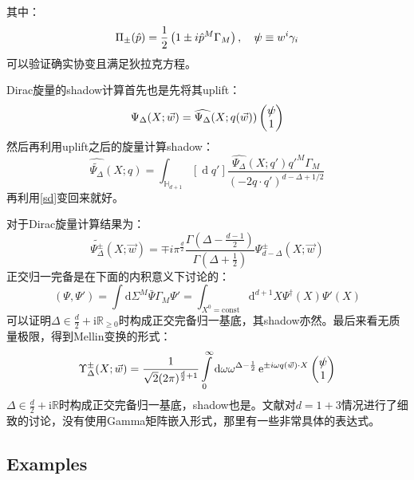 其中：
\begin{equation}
	\Pi_{\pm}(\hat{p})=\frac{1}{2}\left(1\pm i\hat{p}^M\Gamma_M\right),\quad \slashed{w}\equiv w^i\gamma_i
\end{equation}
可以验证确实协变且满足狄拉克方程\sn{\[\left(\Gamma^M\frac{\partial}{\partial X^M}-m\right)\Psi(X)=0\]}。
\begin{definition}
	Dirac旋量的shadow计算首先也是先将其uplift：
	\begin{equation}\label{sd}
		\Psi_\Delta(X;\vec{w})=\widehat{\Psi_\Delta}(X;q(\vec{w}))\begin{pmatrix}\slashed{w}\\1\end{pmatrix}
	\end{equation}
	然后再利用uplift之后的旋量计算shadow：
	\begin{equation}
		\widehat{\widetilde{\Psi_\Delta}}(X;q)=\int_{\mathbb{H}_{d+1}}[\operatorname{d}q']\frac{\widehat{\Psi_\Delta}(X;q')q'^M\Gamma_M}{(-2q\cdot q')^{d-\Delta+1/2}}
	\end{equation}
	再利用\ref{sd}变回来就好。
\end{definition}
对于Dirac旋量计算结果为：
\begin{equation}
	\widetilde{\Psi_\Delta^\pm}(X;\vec{w})=\mp i\pi^{\frac{d}{2}}\frac{\Gamma\left(\Delta-\frac{d-1}{2}\right)}{\Gamma\left(\Delta+\frac{1}{2}\right)}\Psi_{d-\Delta}^{\pm}(X;\vec{w})
\end{equation}
正交归一完备是在下面的内积意义下讨论的：
\begin{equation}
	\left(\Psi,\Psi'\right)=\int\mathrm{d}\Sigma^M\bar{\Psi}\Gamma_M\Psi'=\int_{X^0=\text{const}}\mathrm{d}^{d+1}X\Psi^\dagger(X)\Psi'(X)
\end{equation}
可以证明$\boxed{\Delta\in\frac{d}{2}+\mathrm{i}\mathbb{R}_{\geq 0}}$时构成正交完备归一基底，其shadow亦然。最后来看无质量极限，得到Mellin变换的形式：
\begin{equation}
	\Upsilon_\Delta^\pm(X;\vec{w})=\frac{1}{\sqrt{2}(2\pi)^{\frac{d}{2}+1}}\int\limits_0^\infty\mathrm{d}\omega\omega^{\Delta-\frac{1}{2}}\operatorname{e}^{\pm i\omega q(\vec{w})\cdot X}\begin{pmatrix}\slashed{w}\\1\end{pmatrix}
\end{equation}
$\boxed{\Delta\in\frac{d}{2}+\mathrm{i}\mathbb{R}}$时构成正交完备归一基底，shadow也是。文献\cite{Narayanan:2020amh}对$d=1+3$情况进行了细致的讨论，没有使用Gamma矩阵嵌入形式，那里有一些非常具体的表达式。
\subsection{Examples}